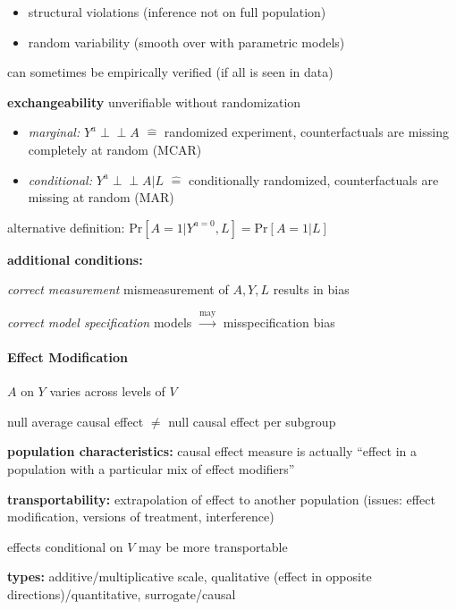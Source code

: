 \documentclass[8pt,twoside]{extarticle}
\newcommand{\indep}{\perp \!\!\! \perp}
\begin{document}
\begin{multicols}{2}
\vspace{-.2em}
\begin{itemize}[itemsep=0em, topsep=0pt, partopsep=0pt,parsep=0pt, leftmargin=1.5em]
\item structural violations (inference not on full population)
\item random variability (smooth over with parametric models)
\end{itemize}
 can sometimes be empirically verified (if all is seen in data)

 \textbf{exchangeability} unverifiable without randomization
\begin{itemize}[itemsep=0em, topsep=0pt, partopsep=0pt,parsep=0pt, leftmargin=1.5em]
\item \textit{marginal:} $Y^a \indep A$ $\widehat{=}$ randomized experiment, \newline counterfactuals are missing completely at random (MCAR)

\item \textit{conditional:} $Y^a {\indep} A|L$ $\widehat{=}$ conditionally randomized, counterfactuals are missing at random (MAR)
\end{itemize}
alternative definition: $ \mathrm{Pr}\left[A=1|Y^{a=0}, L\right] = \mathrm{Pr}\left[A=1|L\right]$

 \textbf{additional conditions:}

 \textit{correct measurement} mismeasurement of $A, Y, L$ results in bias

 \textit{correct model specification} models $\overset{\text{may}}{\rightarrow}$ misspecification bias




\paragraph{Effect Modification} $A$ on $Y$ varies across levels of $V$

 null average causal effect $\neq$ null causal effect per subgroup

 \textbf{population characteristics:} causal effect measure is actually ``effect in a population with a particular mix of effect modifiers''

 \textbf{transportability:} extrapolation of effect to another population (issues: effect modification, versions of treatment, interference)

 effects conditional on $V$ may be more transportable

 \textbf{types:} additive/multiplicative scale,
qualitative (effect in opposite directions)/quantitative, surrogate/causal 



\end{multicols}
\end{document}
